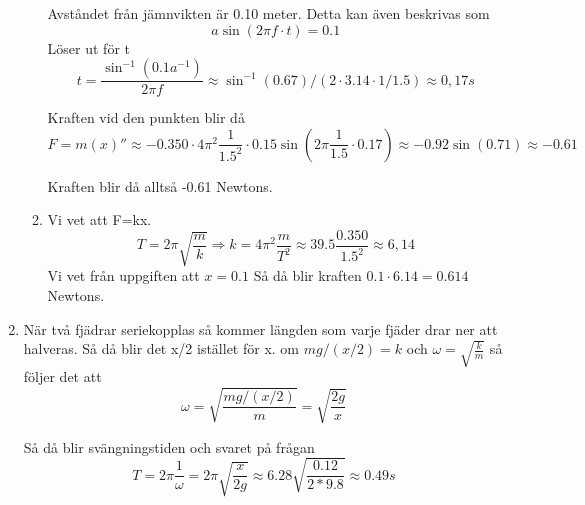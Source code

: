 \documentclass[a4paper,12pt]{article}
\begin{document}
\begin{enumerate}
\begin{enumerate}
        Avståndet från jämnvikten är 0.10 meter. Detta kan även beskrivas som
        $$a\sin(2\pi f\cdot t)=0.1$$
        Löser ut för t
        $$t=\frac{\sin^{-1}(0.1a^{-1})}{2\pi f}\approx\sin^{-1}(0.67)/(2\cdot 3.14 \cdot 1/1.5)\approx 0,17s$$
    
    
        Kraften vid den punkten blir då
        $$
        F=m(x)''\approx-0.350\cdot4\pi^2 \frac{1}{1.5^2}\cdot 0.15\sin(2\pi \frac{1}{1.5}\cdot 0.17)
        \approx -0.92\sin(0.71) \approx -0.61
        $$

        Kraften blir då alltså -0.61 Newtons.

        \item Vi vet att F=kx. 
        $$T=2\pi\sqrt{\frac{m}{k}}\Rightarrow k=4\pi^2\frac{m}{T^2}\approx 39.5\frac{0.350}{1.5^2}\approx 6,14$$
        Vi vet från uppgiften att $x=0.1$
        Så då blir kraften $0.1\cdot 6.14 = 0.614$ Newtons.

    \end{enumerate}

    \item 
    När två fjädrar seriekopplas så kommer längden som varje fjäder drar ner att halveras.
    Så då blir det x/2 istället för x. 
    om $mg/(x/2)=k$ och $\omega = \sqrt{\frac{k}{m}}$ så följer det att 
    $$\omega = \sqrt{\frac{mg/(x/2)}{m}}=\sqrt{\frac{2g}{x}}$$

    Så då blir svängningstiden och svaret på frågan
    $$T=2\pi\frac{1}{\omega}=2\pi\sqrt{\frac{x}{2g}}\approx 6.28\sqrt{\frac{0.12}{2*9.8}}\approx 0.49s$$

\end{enumerate}
\end{document}
